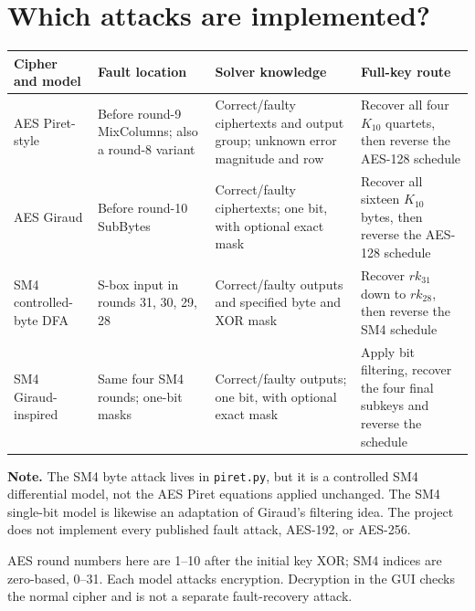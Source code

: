 \documentclass[11pt,a4paper]{report}
\newcommand{\note}[1]{\par\smallskip\noindent\colorbox{pale}{\parbox{0.94\linewidth}{\textbf{Note.} #1}}\par\smallskip}
\begin{document}
\section{Which attacks are implemented?}
\begin{center}
\small
\begin{tabular}{p{.15\linewidth}p{.23\linewidth}p{.26\linewidth}p{.25\linewidth}}
\toprule
Cipher and model & Fault location & Solver knowledge & Full-key route\\\midrule
AES Piret-style & Before round-9 MixColumns; also a round-8 variant & Correct/faulty ciphertexts and output group; unknown error magnitude and row & Recover all four $K_{10}$ quartets, then reverse the AES-128 schedule\\[2mm]
AES Giraud & Before round-10 SubBytes & Correct/faulty ciphertexts; one bit, with optional exact mask & Recover all sixteen $K_{10}$ bytes, then reverse the AES-128 schedule\\[2mm]
SM4 controlled-byte DFA & S-box input in rounds 31, 30, 29, 28 & Correct/faulty outputs and specified byte and XOR mask & Recover $rk_{31}$ down to $rk_{28}$, then reverse the SM4 schedule\\[2mm]
SM4 Giraud-inspired & Same four SM4 rounds; one-bit masks & Correct/faulty outputs; one bit, with optional exact mask & Apply bit filtering, recover the four final subkeys and reverse the schedule\\
\bottomrule
\end{tabular}
\end{center}
\note{The SM4 byte attack lives in \texttt{piret.py}, but it is a controlled SM4 differential model, not the AES Piret equations applied unchanged. The SM4 single-bit model is likewise an adaptation of Giraud's filtering idea. The project does not implement every published fault attack, AES-192, or AES-256.}
AES round numbers here are 1--10 after the initial key XOR; SM4 indices are zero-based, 0--31. Each model attacks encryption. Decryption in the GUI checks the normal cipher and is not a separate fault-recovery attack.
\end{document}
